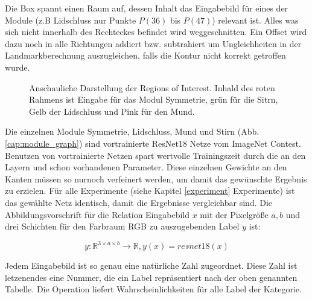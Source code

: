 \vspace{1cm}

Die Box spannt einen Raum auf, dessen Inhalt das Eingabebild für eines der Module (z.B Lidschluss nur Punkte $P(36)$ bis $P(47)$) relevant ist. Alles was sich nicht innerhalb des Rechteckes befindet wird weggeschnitten. Ein Offset wird dazu noch in alle Richtungen addiert bzw. subtrahiert um Ungleichheiten in der Landmarkberechnung auszugleichen, falls die Kontur nicht korrekt getroffen wurde.








\begin{figure}[t]\centering
\makebox[0pt]{}
\vspace{-1cm}
\caption[Anschauliche Darstellung der Regions of Interest]{Anschauliche Darstellung der Regions of Interest\footnotemark. Inhald des roten Rahmens ist Eingabe für das Modul Symmetrie, grün für die Sitrn, Gelb der Lidschluss und Pink für den Mund.}\label{cap:r_of_interest}
\end{figure}\label{fig:r_of_interest}


Die einzelnen Module Symmetrie, Lidschluss, Mund und Stirn (Abb. \ref{cap:module_graph}) sind vortrainierte ResNet18 Netze vom ImageNet Contest. Benutzen von vortrainierte Netzen spart wertvolle Trainingszeit durch die an den Layern und schon vorhandenen Parameter. Diese einzelnen Gewichte an den Kanten müssen so nurnoch verfeinert werden, um damit das gewünschte Ergebnis zu erzielen. Für alle Experimente (siehe Kapitel \ref{experiment} Experimente) ist das gewählte Netz identisch, damit die Ergebnisse vergleichbar sind. Die Abbildungsvorschrift für die Relation Eingabebild $x$ mit der Pixelgröße $a, b$ und drei Schichten für den Farbraum RGB zu auszugebenden Label $y$ ist:

\begin{equation}
y: \mathbb{R}^{3 \times a \times b} \to \mathbb{R}, y(x) = resnet18(x)
\end{equation}

Jedem Eingabebild ist so genau eine natürliche Zahl zugeordnet. Diese Zahl ist letzenendes eine Nummer, die ein Label repräsentiert nach der oben genannten Tabelle. Die Operation liefert Wahrscheinlichkeiten für alle Label der Kategorie.

